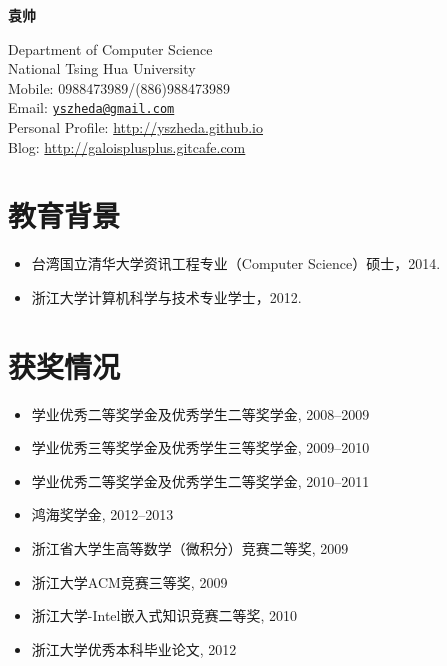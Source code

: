 \documentclass[letterpaper]{article}
\def\name{袁帅}
\begin{document}
\centerline{\huge\bf \name} \vspace{0.25in}
\begin{minipage}[t]{0.8\textwidth}
Department of Computer Science \\
National Tsing Hua University \\
Mobile: 0988473989/(886)988473989   \\
Email: \href{mailto:yszheda@gmail.com}{\tt yszheda@gmail.com}\\
Personal Profile: \url{http://yszheda.github.io} \\
Blog: \url{http://galoisplusplus.gitcafe.com}
\end{minipage}

\section*{教育背景}
\begin{itemize}
\item 台湾国立清华大学资讯工程专业（Computer Science）硕士，2014.
\item 浙江大学计算机科学与技术专业学士，2012.
\end{itemize}

\section*{获奖情况}
\begin{itemize}
  \item 学业优秀二等奖学金及优秀学生二等奖学金, 2008--2009
  \item 学业优秀三等奖学金及优秀学生三等奖学金, 2009--2010
  \item 学业优秀二等奖学金及优秀学生二等奖学金, 2010--2011
  \item 鸿海奖学金, 2012--2013				
  \item 浙江省大学生高等数学（微积分）竞赛二等奖, 2009
  \item 浙江大学ACM竞赛三等奖, 2009
  \item 浙江大学-Intel嵌入式知识竞赛二等奖, 2010
  \item 浙江大学优秀本科毕业论文, 2012
\end{itemize}
\end{document}
